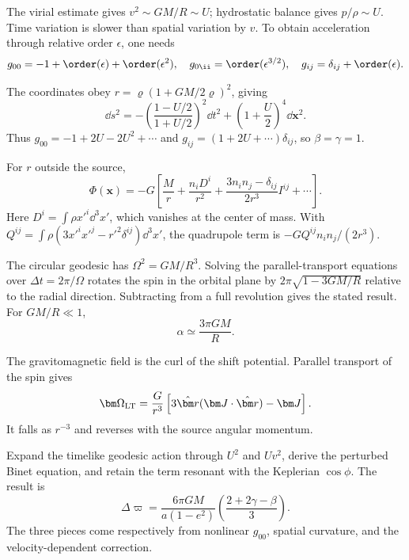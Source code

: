 \begin{solutions}

\begin{solution}
The virial estimate gives \(v^2\sim GM/R\sim U\); hydrostatic balance gives
\(p/\rho\sim U\).  Time variation is slower than spatial variation by \(v\).
To obtain acceleration through relative order \(\epsilon\), one needs
\[
g_{00}=-1+\order(\epsilon)+\order(\epsilon^2),\quad
g_{0\ii}=\order(\epsilon^{3/2}),\quad
g_{ij}=\delta_{ij}+\order(\epsilon).
\]
\end{solution}

\begin{solution}
The coordinates obey
\(r=\varrho(1+GM/2\varrho)^2\), giving
\[
\dd s^2
=-\left(\frac{1-U/2}{1+U/2}\right)^2\dd t^2
+\left(1+\frac U2\right)^4\dd\bm x^2.
\]
Thus
\(g_{00}=-1+2U-2U^2+\cdots\) and
\(g_{ij}=(1+2U+\cdots)\delta_{ij}\), so
\(\beta=\gamma=1\).
\end{solution}

\begin{solution}
For \(r\) outside the source,
\[
\Phi(\bm x)
=-G\left[\frac Mr+\frac{n_iD^i}{r^2}
+\frac{3n_in_j-\delta_{ij}}{2r^3}I^{ij}+\cdots\right].
\]
Here \(D^i=\int\rho x'^i\dd^3x'\), which vanishes at the center of mass.  With
\(Q^{ij}=\int\rho(3x'^ix'^j-r'^2\delta^{ij})\dd^3x'\), the quadrupole term is
\(-GQ^{ij}n_in_j/(2r^3)\).
\end{solution}

\begin{solution}
The circular geodesic has
\(\Omega^2=GM/R^3\).  Solving the parallel-transport equations over
\(\Delta t=2\pi/\Omega\) rotates the spin in the orbital plane by
\(2\pi\sqrt{1-3GM/R}\) relative to the radial direction.  Subtracting from a
full revolution gives the stated result.  For \(GM/R\ll1\),
\[
\alpha\simeq\frac{3\pi GM}{R}.
\]
\end{solution}

\begin{solution}
The gravitomagnetic field is the curl of the shift potential.  Parallel
transport of the spin gives
\[
\bm\Omega_{\rm LT}
=\frac{G}{r^3}\left[3\hat{\bm r}
(\bm J\cdot\hat{\bm r})-\bm J\right].
\]
It falls as \(r^{-3}\) and reverses with the source angular momentum.
\end{solution}

\begin{solution}
Expand the timelike geodesic action through \(U^2\) and \(Uv^2\), derive the
perturbed Binet equation, and retain the term resonant with the Keplerian
\(\cos\phi\).  The result is
\[
\Delta\varpi
=\frac{6\pi GM}{a(1-e^2)}
\left(\frac{2+2\gamma-\beta}{3}\right).
\]
The three pieces come respectively from nonlinear \(g_{00}\), spatial
curvature, and the velocity-dependent correction.
\end{solution}


\end{solutions}
